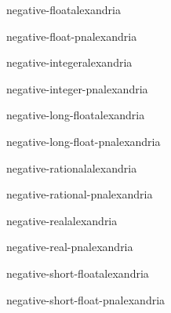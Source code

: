 \begin{type}{negative-float}{}{alexandria}{}
  
\end{type}

\begin{function}{negative-float-p}{n}{alexandria}{}
  
\end{function}

\begin{type}{negative-integer}{}{alexandria}{}
  
\end{type}

\begin{function}{negative-integer-p}{n}{alexandria}{}
  
\end{function}

\begin{type}{negative-long-float}{}{alexandria}{}
  
\end{type}

\begin{function}{negative-long-float-p}{n}{alexandria}{}
  
\end{function}

\begin{type}{negative-rational}{}{alexandria}{}
  
\end{type}

\begin{function}{negative-rational-p}{n}{alexandria}{}
  
\end{function}

\begin{type}{negative-real}{}{alexandria}{}
  
\end{type}

\begin{function}{negative-real-p}{n}{alexandria}{}
  
\end{function}

\begin{type}{negative-short-float}{}{alexandria}{}
  
\end{type}

\begin{function}{negative-short-float-p}{n}{alexandria}{}
  
\end{function}

